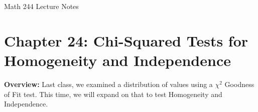 \documentclass[12pt]{amsart}
\date{}
\theoremstyle{definition}
\begin{document}
\newcommand{\ph}{\phantom}
\newcommand{\ds}{\displaystyle}

\renewcommand{\emph}{\textbf}
\onehalfspace


\fancyhf{}   %
\renewcommand{\headrulewidth}{0.4pt} %
\fancyfootoffset[LE,LO]{0in}        %
\renewcommand{\footrulewidth}{0.4pt} %




\begin{center}

	\larger[3]	Math 244 Lecture Notes \smaller[3]		\\[22pt]

\end{center}

\section*{Chapter 24: Chi-Squared Tests for Homogeneity and Independence}




 \textbf{Overview:} Last class, we examined a distribution of values using a $\chi^2$ Goodness of Fit test. This time, we will expand on that to test Homogeneity and Independence.
 
\end{document}
